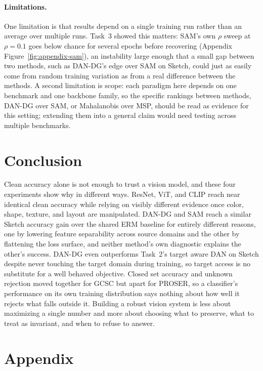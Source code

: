 \documentclass{article}
\begin{document}
\paragraph{Limitations.}
One limitation is that results depend on a single training run
rather than an average over multiple runs. Task~3 showed this matters:
SAM's own $\rho$ sweep at $\rho=0.1$ goes below chance for several epochs
before recovering (Appendix Figure~\ref{fig:appendix-sam}), an
instability large enough that a small gap between two methods, such as
DAN-DG's edge over SAM on Sketch, could just as easily come from random
training variation as from a real difference between the methods. A
second limitation is scope: each
paradigm here depends on one
benchmark and one backbone family, so the specific rankings between
methods, DAN-DG over SAM, or Mahalanobis over MSP, should be read as
evidence for this setting; extending them into a general claim would need
testing across multiple benchmarks.

\section{Conclusion}
\label{sec:conclusion}

Clean accuracy alone is not enough to trust a vision model, and these
four experiments show why in different ways. ResNet, ViT, and
CLIP reach near identical clean accuracy while relying on visibly
different evidence once color, shape, texture, and layout are
manipulated. DAN-DG and SAM reach a similar Sketch accuracy gain over the
shared ERM baseline for entirely different reasons, one by lowering
feature separability across source domains and the other by flattening
the loss surface, and neither method's own diagnostic explains the
other's success. DAN-DG even outperforms Task~2's target aware DAN on
Sketch despite never touching the target domain during training, so
target access is no substitute for a well behaved objective. Closed set
accuracy and unknown rejection moved together for GCSC but apart for
PROSER, so a classifier's performance on its own training distribution
says nothing about how well it rejects what falls outside it. Building a
robust vision system is less about maximizing a single number and more
about choosing what to preserve, what to treat as invariant, and when to
refuse to answer.

\clearpage



\clearpage
\appendix
\section{Appendix}
\label{sec:appendix}
\end{document}
